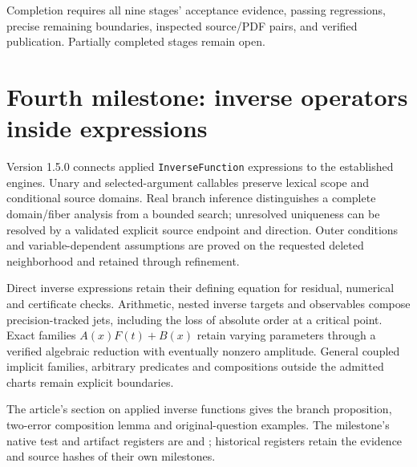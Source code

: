 \documentclass[11pt,a4paper]{article}
\newcommand{\wl}[1]{\texttt{#1}}
\begin{document}
Completion requires all nine stages' acceptance evidence, passing regressions, precise remaining boundaries, inspected source/PDF pairs, and verified publication. Partially completed stages remain open.

\section{Fourth milestone: inverse operators inside expressions}

Version 1.5.0 connects applied \wl{InverseFunction} expressions to the
established engines. Unary and selected-argument callables preserve lexical
scope and conditional source domains. Real branch inference distinguishes
a complete domain/fiber analysis from a bounded search; unresolved
uniqueness can be resolved by a validated explicit source endpoint and
direction. Outer conditions and variable-dependent assumptions are proved
on the requested deleted neighborhood and retained through refinement.

Direct inverse expressions retain their defining equation for residual,
numerical and certificate checks. Arithmetic, nested inverse targets and
observables compose precision-tracked jets, including the loss of absolute
order at a critical point. Exact families $A(x)F(t)+B(x)$ retain varying
parameters through a verified algebraic reduction with eventually nonzero
amplitude. General coupled implicit families, arbitrary predicates and
compositions outside the admitted charts remain explicit boundaries.

The article's section on applied inverse functions gives the branch
proposition, two-error composition lemma and original-question examples.
The milestone's native test and artifact registers are
 and
; historical registers retain
the evidence and source hashes of their own milestones.
\end{document}
